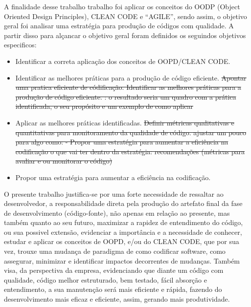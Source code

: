 \documentclass[12pt]{article}
\begin{document}
A finalidade desse trabalho trabalho foi aplicar os conceitos do OODP (Object Oriented Design Principles), CLEAN CODE e “AGILE”, sendo assim, o objetivo geral foi analisar uma estratégia para produção de códigos com qualidade. A partir disso para alçancar o objetivo geral foram definidos os seguindos objetivos especificos: 
\begin{itemize}
	\item Identificar a correta aplicação dos conceitos de OOPD/CLEAN CODE.
	\item Identificar as melhores práticas para a produção de código eficiente.  
\sout{
Apontar uma pratica eficiente de códificação.
Identificar as melhores práticas para a produção de código eficiente. :
o resultado seria um quadro com a prática identificada, o seu propósito e um exemplo de como aplicar}
	\item Aplicar as melhores práticas identificadas.
\sout{ Definir métricas qualitativas e quantitativas para monitoramento da qualidade de código. ajustar um pouco para algo como: - Propor uma estratégia para aumentar a eficiência na codificação o que vai ter dentro da estratégia: recomendações (métricas para avaliar e ou monitorar o código)}
	\item Propor uma estratégia para aumentar a eficiência na codificação.
\end{itemize} 

O presente trabalho justifica-se por uma forte necessidade de ressaltar ao desenvolvedor, a responsabilidade direta pela produção do artefato final da fase de desenvolvimento (código-fonte)\cite{TR_CLEAN_CODE_IMPORTANCIA}, não apenas em relação ao presente, mas também quanto ao seu futuro, maximizar a rapidez de entendimento do código, ou sua possivel extensão, evidenciar a importância e a necessidade de conhecer, estudar e aplicar os conceitos de OOPD, e/ou do CLEAN CODE, que por sua vez, trouxe uma mudança de paradigma de como codificar software, como assegurar, minimizar e identificar impactos decorrentes de mudanças\cite{CODE_SIMPLICITY}.
Também visa, da perspectiva da empresa, evidenciando que diante um código com qualidade, código melhor estruturado, bem testado, fácil absorção e entendimento, a sua manutenção será mais eficiente e rápida, fazendo do desenvolvimento mais eficaz e eficiente, assim, gerando mais produtividade.
\end{document}
